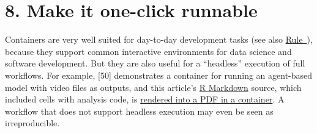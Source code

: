 \documentclass[10pt,letterpaper]{article}
\begin{document}
\hypertarget{make-it-one-click-runnable}{%
\section*{8. Make it one-click
runnable}\label{make-it-one-click-runnable}}

  \label{rule:interactive} 

Containers are very well suited for day-to-day development tasks (see
also \hyperref[{rule:usage}]{Rule~}), because they
support common interactive environments for data science and software
development. But they are also useful for a ``headless'' execution of
full workflows. For example, {[}50{]} demonstrates a container for
running an agent-based model with video files as outputs, and this
article's \href{https://rmarkdown.rstudio.com/}{R Markdown} source,
which included cells with analysis code, is
\href{https://github.com/nuest/ten-simple-rules-dockerfiles/blob/master/.travis.yml\#L18}{rendered
into a PDF in a container}. A workflow that does not support headless
execution may even be seen as irreproducible.
\end{document}
